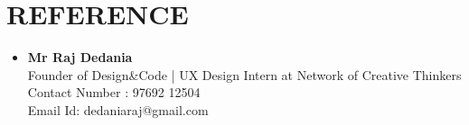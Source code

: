 \documentclass[paper=a4,fontsize=12pt]{scrartcl}
\newcommand{\NewPart}[1]{\section*{\uppercase{#1}}}
\begin{document}
\NewPart{Reference}{}
\begin{itemize}
	\item \textbf{Mr Raj Dedania} \\ Founder of Design\&Code | UX Design Intern at Network of Creative Thinkers \\ Contact Number : 97692 12504 \\ Email Id: dedaniaraj@gmail.com 
\end{itemize}
\end{document}
